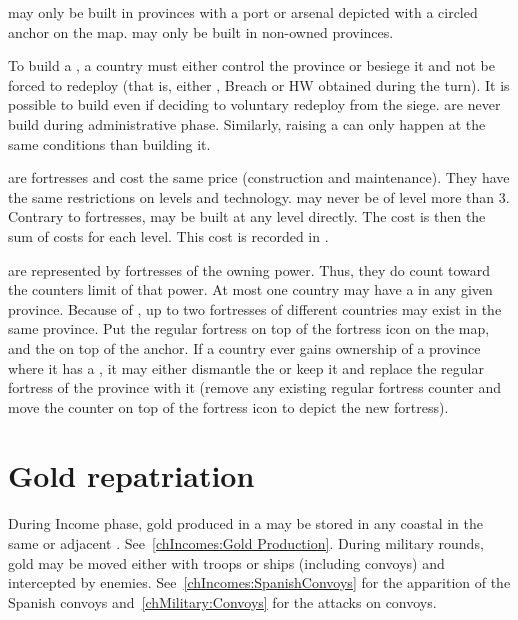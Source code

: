 \label{chRedep:Presidios}
\bparag \Presidios may only be built in provinces with a port or arsenal
depicted with a circled anchor on the map.
\bparag \Presidios may only be built in non-owned provinces.

\bparag To build a \Presidio, a country must either control the province or
besiege it and not be forced to redeploy (that is, either \USURE\Faceplus,
Breach or HW obtained during the turn).
\bparag It is possible to build \Presidio even if deciding to voluntary
redeploy from the siege.
\bparag \Presidios are never build during administrative phase. Similarly,
raising a \Presidio can only happen at the same conditions than building it.

\aparag[Cost]
\bparag \Presidios are fortresses and cost the same price (construction and
maintenance). They have the same restrictions on levels and technology.
\bparag \Presidios may never be of level more than 3.
\bparag Contrary to fortresses, \Presidios may be built at any level
directly. The cost is then the sum of costs for each level.
\bparag This cost is recorded in .

\bparag \Presidios are represented by fortresses of the owning power. Thus,
they do count toward the counters limit of that power.
\bparag At most one country may have a \Presidio in any given province.
\bparag Because of \Presidios, up to two fortresses of different countries may
exist in the same province. Put the regular fortress on top of the fortress
icon on the map, and the \Presidio on top of the anchor.
\bparag If a country ever gains ownership of a province where it has a
\Presidio, it may either dismantle the \Presidio or keep it and replace the
regular fortress of the province with it (remove any existing regular fortress
counter and move the \Presidio counter on top of the fortress icon to depict
the new fortress).

\section{Gold repatriation}\label{chRedep:Gold Repatriation}

\bparag[Income.] During Income phase, gold produced in a \COL may be stored in
any coastal \COL in the same or adjacent \Area. See~\ref{chIncomes:Gold
  Production}.
\bparag[Military.] During military rounds, gold may be moved either with
troops or ships (including convoys) and intercepted by
enemies. See~\ref{chIncomes:SpanishConvoys} for the apparition of the Spanish
convoys and~\ref{chMilitary:Convoys} for the attacks on convoys.

